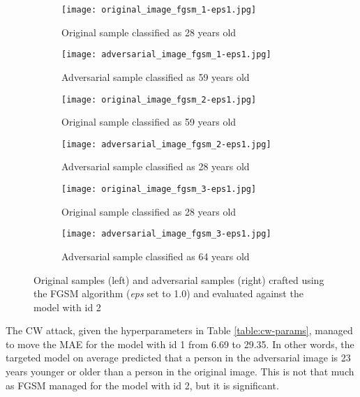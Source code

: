\begin{figure}

\begin{subfigure}{.5\textwidth}
  \centering
  \texttt{[image: original\_image\_fgsm\_1-eps1.jpg]}
  \caption{Original sample classified as 28 years old}
\end{subfigure}
\begin{subfigure}{.5\textwidth}
  \centering
  \texttt{[image: adversarial\_image\_fgsm\_1-eps1.jpg]}
  \caption{Adversarial sample classified as 59 years old}
\end{subfigure}

\begin{subfigure}{.5\textwidth}
  \centering
  \texttt{[image: original\_image\_fgsm\_2-eps1.jpg]}
  \caption{Original sample classified as 59 years old}
\end{subfigure}
\begin{subfigure}{.5\textwidth}
  \centering
  \texttt{[image: adversarial\_image\_fgsm\_2-eps1.jpg]}
  \caption{Adversarial sample classified as 28 years old}
\end{subfigure}

\begin{subfigure}{.5\textwidth}
  \centering
  \texttt{[image: original\_image\_fgsm\_3-eps1.jpg]}
  \caption{Original sample classified as 28 years old}
\end{subfigure}
\begin{subfigure}{.5\textwidth}
  \centering
  \texttt{[image: adversarial\_image\_fgsm\_3-eps1.jpg]}
  \caption{Adversarial sample classified as 64 years old}
\end{subfigure}

\caption{Original samples (left) and adversarial samples (right) crafted using the FGSM algorithm (\textit{eps} set to 1.0) and evaluated against the model with id 2}
\label{fig:fgsm-attack-eps1}
\end{figure}

The CW attack, given the hyperparameters in Table \ref{table:cw-params}, managed to move the MAE for the model with id 1 from 6.69 to 29.35. In other words, the targeted model on average predicted that a person in the adversarial image is 23 years younger or older than a person in the original image. This is not that much as FGSM managed for the model with id 2, but it is significant.

